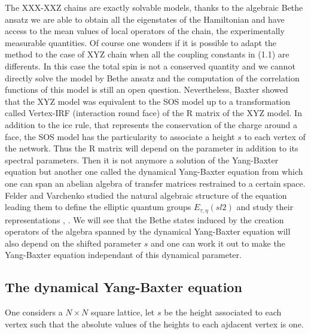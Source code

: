 \documentclass[12pt]{article}
\begin{document}
The XXX-XXZ chains are exactly solvable models, thanks to the algebraic Bethe ansatz we are able to obtain all the eigenstates of the Hamiltonian and have access to the mean values of local operators of the chain, the experimentally measurable quantities. Of course one wonders if it is possible to adapt the method to the case of XYZ chain when all the coupling constants in (1.1) are differents. In this case the total spin is not a conserved quantity and we cannot directly solve the model by Bethe ansatz and the computation of the correlation functions of this model is still an open question. Nevertheless, Baxter showed that the XYZ model was equivalent to the SOS model up to a transformation called Vertex-IRF (interaction round face) of the R matrix  of the XYZ model. In addition to the ice rule, that represents the conservation of the charge around a face, the SOS model has the particularity to associate a height $s $ to each vertex of the network. Thus the R matrix will depend on the parameter in addition to its spectral parameters. Then it is not anymore a solution of the Yang-Baxter equation but another one called the dynamical Yang-Baxter equation from which one can span an abelian algebra of transfer matrices restrained to a certain space. Felder and Varchenko studied the natural algebraic structure of the equation leading them to define the elliptic quantum groups $ E _{\tau,\eta}(sl2) $ and study their representations \cite{FelV96a}, \cite{FelV96b}. We will see that the Bethe states induced by the creation operators of the algebra spanned by the dynamical Yang-Baxter equation will also depend on the shifted parameter $ s $  and one can work it out to make the Yang-Baxter equation independant of this dynamical parameter.

\subsection{The dynamical Yang-Baxter equation}

One considers a $N\times N$ square lattice, let $s$ be the height associated to each vertex such that the absolute values of the heights to each ajdacent vertex is one.

\medskip
\end{document}
